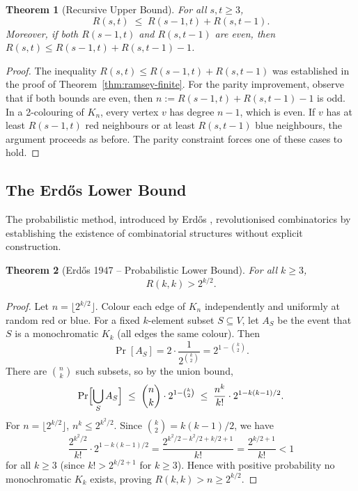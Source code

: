 \documentclass[12pt,a4paper]{amsart}
\newtheorem{theorem}{Theorem}[section]
\theoremstyle{definition}
\theoremstyle{remark}
\begin{document}
\begin{theorem}[Recursive Upper Bound]\label{thm:recursive}
For all $s,t \ge 3$,
\[
  R(s,t) \;\le\; R(s-1,t) + R(s,t-1).
\]
Moreover, if both $R(s-1,t)$ and $R(s,t-1)$ are even, then
$R(s,t) \le R(s-1,t) + R(s,t-1) - 1$.
\end{theorem}

\begin{proof}
The inequality $R(s,t) \le R(s-1,t) + R(s,t-1)$ was established in the proof
of Theorem~\ref{thm:ramsey-finite}.  For the parity improvement, observe that
if both bounds are even, then $n := R(s-1,t) + R(s,t-1) - 1$ is odd.  In a
2-colouring of $K_n$, every vertex $v$ has degree $n-1$, which is even.  If
$v$ has at least $R(s-1,t)$ red neighbours or at least $R(s,t-1)$ blue neighbours,
the argument proceeds as before.  The parity constraint forces one of these cases
to hold.
\end{proof}

\subsection{The Erd\H{o}s Lower Bound}

The probabilistic method, introduced by Erd\H{o}s \cite{Erdos1947}, revolutionised
combinatorics by establishing the existence of combinatorial structures without
explicit construction.

\begin{theorem}[Erd\H{o}s 1947 -- Probabilistic Lower Bound]\label{thm:erdos-lower}
For all $k \ge 3$,
\[
  R(k,k) > 2^{k/2}.
\]
\end{theorem}

\begin{proof}
Let $n = \lfloor 2^{k/2} \rfloor$.  Colour each edge of $K_n$ independently and
uniformly at random red or blue.  For a fixed $k$-element subset $S \subseteq V$,
let $A_S$ be the event that $S$ is a monochromatic $K_k$ (all edges the same
colour).  Then
\[
  \Pr[A_S] = 2 \cdot \frac{1}{2^{\binom{k}{2}}} = 2^{1-\binom{k}{2}}.
\]
There are $\binom{n}{k}$ such subsets, so by the union bound,
\[
  \Pr\Bigl[\bigcup_S A_S\Bigr]
  \;\le\; \binom{n}{k} \cdot 2^{1-\binom{k}{2}}
  \;\le\; \frac{n^k}{k!} \cdot 2^{1-k(k-1)/2}.
\]
For $n = \lfloor 2^{k/2}\rfloor$, $n^k \le 2^{k^2/2}$.  Since
$\binom{k}{2} = k(k-1)/2$, we have
\[
  \frac{2^{k^2/2}}{k!} \cdot 2^{1-k(k-1)/2}
  = \frac{2^{k^2/2 - k^2/2 + k/2 + 1}}{k!}
  = \frac{2^{k/2+1}}{k!} < 1
\]
for all $k \ge 3$ (since $k! > 2^{k/2+1}$ for $k \ge 3$).  Hence with positive
probability no monochromatic $K_k$ exists, proving $R(k,k) > n \ge 2^{k/2}$.
\end{proof}
\end{document}
